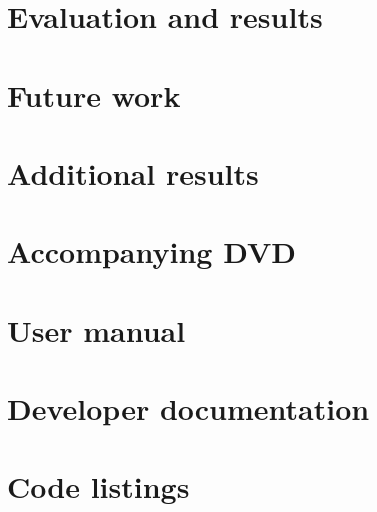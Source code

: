 \documentclass[a4paper,12pt]{report}
\begin{document}
\chapter{Evaluation and results}

\clearpage
\clearpage


\chapter{Future work}



\newpage


\newpage
\appendix

\chapter{Additional results}


\chapter{Accompanying DVD}


\chapter{User manual}


\chapter{Developer documentation}


\chapter{Code listings}

\end{document}
